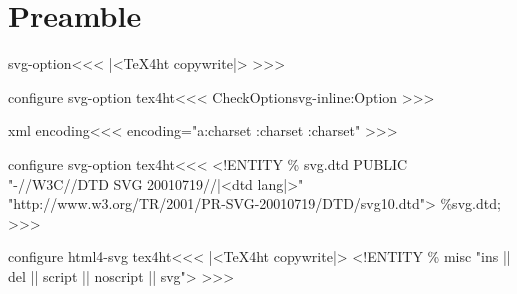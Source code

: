 %


\ifx \HTML\UnDef
   \def\HTML{svg-option,html4-svg}                   
   \def\CONFIG{\jobname}
   \def\MAKETITLE{\author{Eitan M. Gurari}}         
   \def\next{  \endinput}
   \expandafter\next
\fi




\chapter{Preamble}

\<svg-option\><<<
|<TeX4ht copywrite|>
>>>

\<configure svg-option tex4ht\><<<    
\:CheckOption{svg-inline}\if:Option
  {\IgnorePar{}}
>>>

\<xml encoding\><<<
 encoding="\expandafter\ifx \csname a:charset\endcsname\relax
         \expandafter{}\A:charset
   \else \expandafter{}\a:charset\fi"
>>>

\<configure svg-option tex4ht\><<<    
  {<!ENTITY \% svg.dtd PUBLIC "-//W3C//DTD SVG 20010719//|<dtd lang|>"\Hnewline
     "http://www.w3.org/TR/2001/PR-SVG-20010719/DTD/svg10.dtd">\Hnewline
   \%svg.dtd; \Hnewline}
>>>


\<configure html4-svg tex4ht\><<<    
|<TeX4ht copywrite|>
  {<!ENTITY \% misc "ins || del || script || noscript || svg">\Hnewline}
>>>


